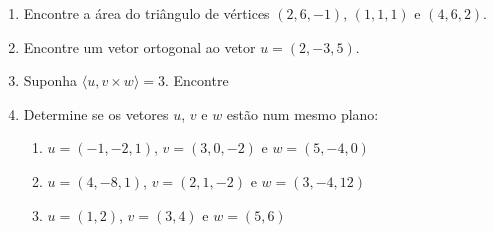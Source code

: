 \documentclass[a4paper,5pt]{amsbook}
\begin{document}
\begin{enumerate}
	\vspace{0.5cm}
	\item Encontre a \'area do tri\^angulo de v\'ertices $(2,6,-1)$, $(1,1,1)$ e $(4,6,2)$.
	
	\vspace{0.5cm}
	\item Encontre um vetor ortogonal ao vetor $u=(2,-3,5)$.

	\vspace{0.5cm}
	\item Suponha $\langle u, v \times w \rangle = 3$. Encontre


	\vspace{0.5cm}
	\item Determine se os vetores $u$, $v$ e $w$ est\~ao num mesmo plano:
		\begin{enumerate}
			\item $u=(-1,-2,1)$, $v=(3, 0, -2)$ e $w = (5,-4,0)$
			\item $u=(4,-8,1)$, $v=(2,1,-2)$ e $w=(3,-4,12)$
			\item $u=(1,2)$, $v=(3,4)$ e $w=(5,6)$
		\end{enumerate}
\end{enumerate}
\end{document}
